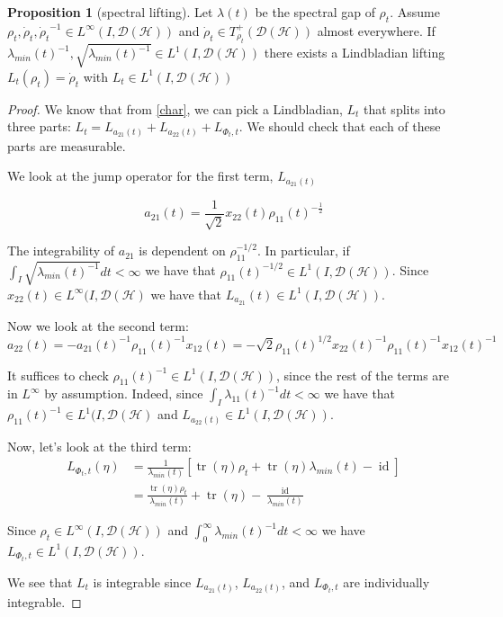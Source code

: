 \documentclass[11pt,reqno]{amsart}
\theoremstyle{definition}
\newtheorem{proposition}[theorem]{Proposition}
\newcommand{\mc}{\mathcal}
\newcommand{\inv}{^{-1}}
\DeclareMathOperator{\tr}{tr}
\DeclareMathOperator{\id}{id}
\begin{document}
\begin{proposition}[spectral lifting]\label{speclift} Let $\lambda(t)$ be the spectral gap of $\rho_t$. Assume $\rho_t, \dot \rho_t, {\dot \rho_t}^{-1} \in L^{\infty}(I,\mc D(\mc H))$ and $\dot \rho_t \in T^+_{\rho_t}(\mc D(\mc H))$ almost everywhere. If  $\lambda_{min}(t)^{-1}, \sqrt{\lambda_{min}(t)^{-1}} \in L^1(I, \mc D(\mc H))$ there exists a Lindbladian lifting $L_t(\rho_t) = \dot \rho_t$ with $L_t \in L^1(I, \mc D(\mc H))$
\end{proposition}
\begin{proof}
We know that from \cref{char}, we can pick a Lindbladian, $L_t$ that splits into three parts: $L_t = L_{a_{21}(t)} +  L_{a_{22}(t)} + L_{\Phi_t,t}$. We should check that each of these parts are measurable.

We look at the jump operator for the first term, $L_{a_{21}(t)}$

$$a_{21}(t)=\frac{1}{\sqrt{2}}x_{22}(t)\rho_{11}(t)^{-\frac{1}{2}}$$

The integrability of $a_{21}$ is dependent on $\rho_{11}^{-1/2}$. In particular, if $\int_I \sqrt{\lambda_{min}(t)^{-1}} dt < \infty$ we have that $\rho_{11}(t)^{-1/2} \in L^1(I, \mc D(\mc H))$. Since $x_{22}(t) \in L^\infty(I, \mc D(\mc H)$ we have that $L_{a_{21}}(t) \in L^1(I, \mc D(\mc H))$. 

Now we look at the second term:
$$a_{22}(t)=-a_{21}(t)\inv\rho_{11}(t)\inv x_{12}(t) = -\sqrt{2} \rho_{11}(t)^{1/2} x_{22}(t)^{-1} \rho_{11}(t)^{-1}x_{12}(t)^{-1}$$

 It suffices to check $\rho_{11}(t)^{-1} \in L^1(I,\mc D(\mc H))$, since the rest of the terms are in $L^\infty$ by assumption. Indeed, since $\int_I \lambda_{11}(t)^{-1} dt < \infty$ we have that $\rho_{11}(t)^{-1} \in L^1(I, \mc D(\mc H)$ and $L_{a_{22}(t)} \in L^1(I, \mc D(\mc H))$. 



Now, let's look at the third term: \begin{align*}L_{\Phi_t,t}(\eta) &= \frac{1}{\lambda_{min}(t)}[\tr(\eta)\rho_t + \tr(\eta) \lambda_{min}(t) - \id] \\ &= \frac{\tr(\eta)\rho_t}{\lambda_{min}(t)} + \tr(\eta) -  \frac{\id}{\lambda_{min}(t)} \end{align*}

 Since $\rho_t \in L^\infty(I, \mc D(\mc H))$ and $\int_0^{\infty} \lambda_{min}(t)^{-1} dt < \infty$ we have $L_{\Phi_t,t} \in L^{1}(I, \mc D(\mc H))$. 

We see that $L_t$ is integrable since $L_{a_{21}(t)}$,  $L_{a_{22}(t)}$, and $L_{\Phi_t,t}$ are individually integrable. 
\end{proof}
\end{document}
